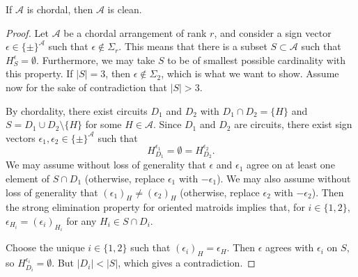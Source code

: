 \documentclass[10pt,a4paper]{amsart}
\newcommand{\cA}{\mathcal{A}}
\begin{document}
\begin{theorem}\label{thm:chordal-means-yoshi}
If $\cA$ is chordal, then $\cA$ is clean.
\end{theorem}

\begin{proof}
Let $\cA$ be a chordal arrangement of rank $r$, and consider a sign vector $\epsilon\in\{\pm\}^\cA$ such that $\epsilon\notin\Sigma_r$.
This means that there is a subset $S\subset\cA$ such that $H_S^\epsilon=\emptyset$.  Furthermore, we may take $S$ to be of smallest possible
cardinality with this property.  If $|S| = 3$, then $\epsilon\notin\Sigma_2$, which is what we want to show.  Assume now for the sake of contradiction that $|S|>3$.

By chordality, there exist circuits
$D_1$ and $D_2$ with $D_1 \cap D_2 = \{H\}$ and $S = D_1 \cup D_2 \setminus\{H\}$ for some $H\in \cA$.
Since $D_1$ and $D_2$ are circuits, there exist sign vectors $\epsilon_1,\epsilon_2\in\{\pm\}^\cA$ such that
$$H_{D_1}^{\epsilon_1} = \emptyset = H_{D_2}^{\epsilon_2}.$$
We may assume without loss of generality that $\epsilon$ and $\epsilon_1$ agree on at least one element of $S\cap D_1$
(otherwise, replace $\epsilon_1$ with $-\epsilon_1$).
We may also assume without loss of generality that $(\epsilon_1)_H \neq (\epsilon_2)_H$ (otherwise, replace $\epsilon_2$ with $-\epsilon_2$).
Then the strong elimination property for oriented matroids implies that, for $i\in\{1,2\}$, $\epsilon_{H_i} = (\epsilon_i)_{H_i}$ for any $H_i\in S\cap D_i$.

Choose the unique $i\in\{1,2\}$ such that $(\epsilon_i)_H = \epsilon_H$.  Then $\epsilon$ agrees with $\epsilon_i$ on $S$, so 
$H_{D_i}^{\epsilon_i} = \emptyset$.  But $|D_i|<|S|$, which gives a contradiction.
\end{proof}
\end{document}
